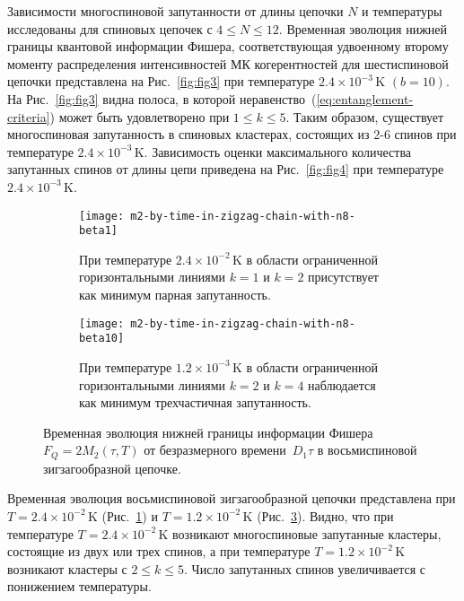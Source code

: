 Зависимости многоспиновой запутанности от длины цепочки $N$ и температуры исследованы для спиновых цепочек с $4\leqslant N \leqslant 12$.
Временная эволюция нижней границы квантовой информации Фишера,
соответствующая  удвоенному второму моменту распределения интенсивностей МК когерентностей для шестиспиновой цепочки представлена на Рис.~\ref{fig:fig3} при температуре $2.4\times 10^{-3}\,\mbox{K}$ $(b=10)$.
На Рис.~\ref{fig:fig3} видна полоса,
в которой неравенство~(\ref{eq:entanglement-criteria}) может быть удовлетворено при $1\leqslant k \leqslant 5$.
Таким образом, существует многоспиновая запутанность в спиновых кластерах, состоящих из 2-6 спинов при температуре $2.4\times 10^{-3}\,\mbox{K}$.
Зависимость оценки максимального количества запутанных спинов от длины цепи приведена на Рис.~\ref{fig:fig4} при температуре $2.4\times 10^{-3}\,\mbox{K}$.

\begin{figure}[H]
  \begin{subfigure}[t]{0.49\textwidth}
    \texttt{[image: m2-by-time-in-zigzag-chain-with-n8-beta1]}
    \caption{
      При температуре $2.4\times 10^{-2}\,\mbox{K}$
      в области ограниченной горизонтальными линиями $k=1$ и $k=2$
      присутствует как минимум парная запутанность.
    }
    \label{fig:fig5}
  \end{subfigure}
  \hfill
  \begin{subfigure}[t]{0.49\textwidth}
    \texttt{[image: m2-by-time-in-zigzag-chain-with-n8-beta10]}
    \caption{
       При температуре $1.2\times 10^{-3}\,\mbox{K}$
       в области ограниченной горизонтальными линиями $k=2$ и $k=4$
       наблюдается как минимум трехчастичная запутанность.
    }
    \label{fig:fig6}
  \end{subfigure}
  \caption{
    Временная эволюция нижней границы информации Фишера~$F_Q=2M_2(\tau, T)$
    от безразмерного времени~$D_1\tau$
    в восьмиспиновой зигзагообразной цепочке.
  }
\end{figure}

Временная эволюция восьмиспиновой зигзагообразной цепочки представлена при $T=2.4\times 10^{-2}\,\mbox{K}$ (Рис.~\ref{fig:fig5}) и $T=1.2\times 10^{-2}\,\mbox{K}$ (Рис.~\ref{fig:fig6}).  Видно, что при температуре $T=2.4\times 10^{-2}\,\mbox{K}$ возникают многоспиновые запутанные кластеры, состоящие из двух или трех спинов, а при температуре $T=1.2\times 10^{-2}\,\mbox{K}$ возникают кластеры с $2\leqslant k \leqslant 5$.
Число запутанных спинов увеличивается с понижением температуры.

